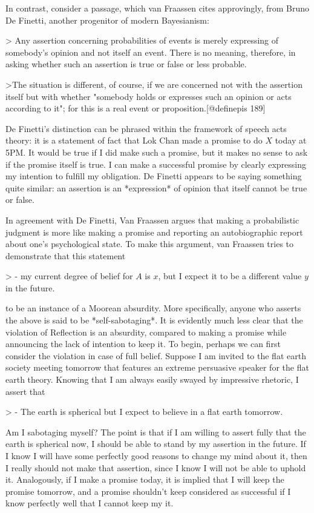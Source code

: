 In contrast, consider a passage, which van Fraassen cites approvingly,
from Bruno De Finetti, another progenitor of modern Bayesianism:

\textgreater{} Any assertion concerning probabilities of events is
merely expressing of somebody's opinion and not itself an event. There
is no meaning, therefore, in asking whether such an assertion is true or
false or less probable.

\textgreater{}The situation is different, of course, if we are concerned
not with the assertion itself but with whether "somebody holds or
expresses such an opinion or acts according to it"; for this is a real
event or proposition.{[}@definepis 189{]}

De Finetti's distinction can be phrased within the framework of speech
acts theory: it is a statement of fact that Lok Chan made a promise to
do \(X\) today at 5PM. It would be true if I did make such a promise,
but it makes no sense to ask if the promise itself is true. I can make a
successful promise by clearly expressing my intention to fulfill my
obligation. De Finetti appears to be saying something quite similar: an
assertion is an *expression* of opinion that itself cannot be true or
false.

In agreement with De Finetti, Van Fraassen argues that making a
probabilistic judgment is more like making a promise and reporting an
autobiographic report about one's psychological state. To make this
argument, van Fraassen tries to demonstrate that this statement

\textgreater{} - my current degree of belief for \(A\) is \(x\), but I
expect it to be a different value \(y\) in the future.

to be an instance of a Moorean absurdity. More specifically, anyone who
asserts the above is said to be *self-sabotaging*. It is evidently much
less clear that the violation of Reflection is an absurdity, compared to
making a promise while announcing the lack of intention to keep it. To
begin, perhaps we can first consider the violation in case of full
belief. Suppose I am invited to the flat earth society meeting tomorrow
that features an extreme persuasive speaker for the flat earth theory.
Knowing that I am always easily swayed by impressive rhetoric, I assert
that

\textgreater{} - The earth is spherical but I expect to believe in a
flat earth tomorrow.

Am I sabotaging myself? The point is that if I am willing to assert
fully that the earth is spherical now, I should be able to stand by my
assertion in the future. If I know I will have some perfectly good
reasons to change my mind about it, then I really should not make that
assertion, since I know I will not be able to uphold it. Analogously, if
I make a promise today, it is implied that I will keep the promise
tomorrow, and a promise shouldn't keep considered as successful if I
know perfectly well that I cannot keep my it.

